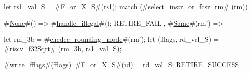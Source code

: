 let rs1_val_S = #\hyperref[sailRISCVzFzyorzyXzyS]{F\_or\_X\_S}#(rs1);
match (#\hyperref[sailRISCVzselectzyinstrzyorzyfcsrzyrm]{select\_instr\_or\_fcsr\_rm}# (rm)) {
  #\hyperref[sailRISCVzNone]{None}#() => { #\hyperref[sailRISCVzhandlezyillegal]{handle\_illegal}#(); RETIRE_FAIL },
  #\hyperref[sailRISCVzSome]{Some}#(rm') => {
    let rm_3b = #\hyperref[sailRISCVzencdeczyroundingzymode]{encdec\_rounding\_mode}#(rm');
    let (fflags, rd_val_S) = #\hyperref[sailRISCVzriscvzyf32Sqrt]{riscv\_f32Sqrt}#   (rm_3b, rs1_val_S);

    #\hyperref[sailRISCVzwritezyfflags]{write\_fflags}#(fflags);
    #\hyperref[sailRISCVzFzyorzyXzyS]{F\_or\_X\_S}#(rd) = rd_val_S;
    RETIRE_SUCCESS
  }
}
